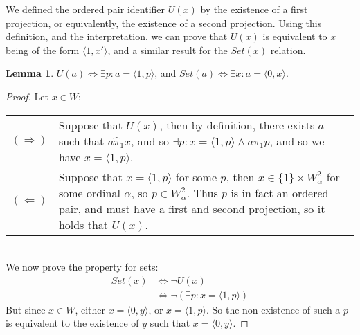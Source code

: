 \documentclass[11pt]{report}
\newcommand{\pleft}{\mathrel{\pi_1}}
\newcommand{\pair}[2]{\langle #1,#2 \rangle}
\newcommand{\zpleft}{\mathrel{\widehat{\pi}_1}}
\theoremstyle{definition}
\theoremstyle{theorem}
\theoremstyle{lemma}
\newtheorem{lemma}[theorem]{Lemma}
\begin{document}
We defined the ordered pair identifier $U(x)$ by the existence of a first projection, or equivalently, the existence of a second projection. Using this definition, and the interpretation, we can prove that $U(x)$ is equivalent to $x$ being of the form $\pair{1}{x'}$, and a similar result for the $\mathit{Set}(x)$ relation.
\begin{lemma} $U(a) \Leftrightarrow \exists p: a = \pair{1}{p}$, and $Set(a)\Leftrightarrow \exists x: a = \pair{0}{x}$.
  \begin{proof} Let $x\in W$:

    \begin{tabular}{p{7mm} p{133mm}}
      $(\Rightarrow)$\rule{0pt}{5mm} &
      Suppose that $U(x)$, then by definition, there exists $a$ such that $a\zpleft x$, and so $\exists p: x=\pair{1}{p} \wedge a\pleft p$, and so we have $x=\pair{1}{p}$.
      \\
      $(\Leftarrow)$ &\rule{0pt}{5mm}
      Suppose that $x = \pair{1}{p}$ for some $p$, then $x\in\{1\}\times W_\alpha^2$ for some ordinal $\alpha$, so $p\in W_\alpha^2$.
      Thus $p$ is in fact an ordered pair, and must have a first and second projection, so it holds that $U(x)$.
    \end{tabular}\\

    \noindent
    We now prove the property for sets:
    \begin{align*}
      \mathit{Set}(x) &\iff \neg U(x) \\
                      &\iff \neg (\exists p: x=\pair{1}{p})
    \end{align*}
    But since $x\in W$, either $x = \pair{0}{y}$, or $x = \pair{1}{p}$. So the non-existence of such a $p$ is equivalent to the existence of $y$ such that $x=\pair{0}{y}$.
  \end{proof}
\end{lemma}
\end{document}
